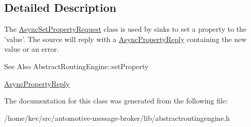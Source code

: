 \subsection{Detailed Description}
The \hyperlink{classAsyncSetPropertyRequest}{Async\-Set\-Property\-Request} class is used by sinks to set a property to the 'value'. The source will reply with a \hyperlink{classAsyncPropertyReply}{Async\-Property\-Reply} containing the new value or an error. 

\begin{DoxySeeAlso}{See Also}
Abstract\-Routing\-Engine\-::set\-Property 

\hyperlink{classAsyncPropertyReply}{Async\-Property\-Reply} 
\end{DoxySeeAlso}


The documentation for this class was generated from the following file\-:\begin{DoxyCompactItemize}
\item 
/home/kev/src/automotive-\/message-\/broker/lib/abstractroutingengine.\-h\end{DoxyCompactItemize}
